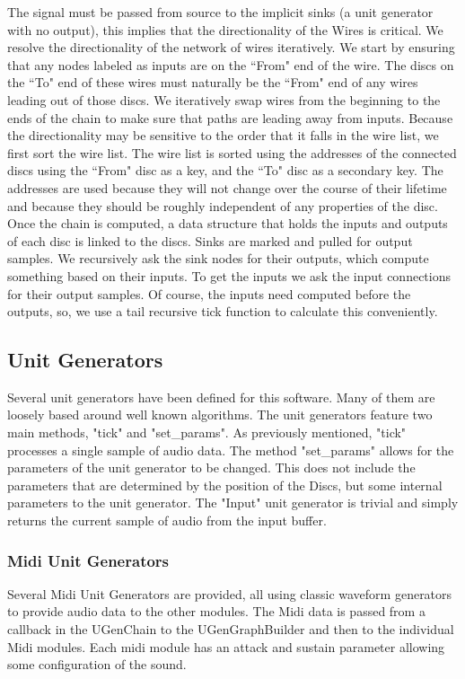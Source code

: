 \documentclass[pdftext,twoside,10pt]{article}
\begin{document}
The signal must be passed from source to the implicit sinks (a unit generator with no output), this implies that the directionality of the Wires is critical. We resolve the directionality of the network of wires iteratively. We start by ensuring that any nodes labeled as inputs are on the ``From" end of the wire. The discs on the ``To" end of these wires must naturally be the ``From" end of any wires leading out of those discs. We iteratively swap wires from the beginning to the ends of the chain to make sure that paths are leading away from inputs. Because the directionality may be sensitive to the order that it falls in the wire list, we first sort the wire list. The wire list is sorted using the addresses of the connected discs using the ``From" disc as a key, and the ``To" disc as a secondary key. The addresses are used because they will not change over the course of their lifetime and because they should be roughly independent of any properties of the disc.\\

Once the chain is computed, a data structure that holds the inputs and outputs of each disc is linked to the discs. Sinks are marked and pulled for output samples. We recursively ask the sink nodes for their outputs, which compute something based on their inputs. To get the inputs we ask the input connections for their output samples. Of course, the inputs need computed before the outputs, so, we use a tail recursive tick function to calculate this conveniently.

\subsection{Unit Generators}
Several unit generators have been defined for this software. Many of them are loosely based around well known algorithms. The unit generators feature two main methods, "tick" and "set\_params". As previously mentioned, "tick" processes a single sample of audio data. The method "set\_params" allows for the parameters of the unit generator to be changed. This does not include the parameters that are determined by the position of the Discs, but some internal parameters to the unit generator. The "Input" unit generator is trivial and simply returns the current sample of audio from the input buffer.

\subsubsection*{Midi Unit Generators} Several Midi Unit Generators are provided, all using classic waveform generators to provide audio data to the other modules. The Midi data is passed from a callback in the UGenChain to the UGenGraphBuilder and then to the individual Midi modules. Each midi module has an attack and sustain parameter allowing some configuration of the sound.
\end{document}
